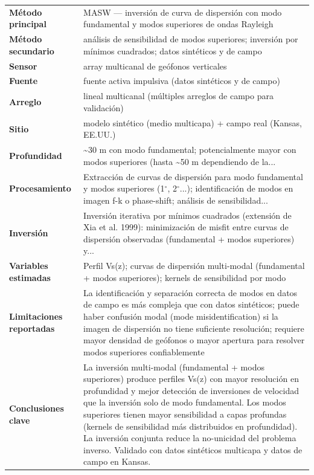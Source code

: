 \begin{center}\scriptsize
\begin{tabularx}{\textwidth}{@{}>{\bfseries}p{3.3cm} X@{}}
\toprule
M\'etodo principal & MASW --- inversión de curva de dispersión con modo fundamental y modos superiores de ondas Rayleigh \\
M\'etodo secundario & análisis de sensibilidad de modos superiores; inversión por mínimos cuadrados; datos sintéticos y de campo \\
Sensor & array multicanal de geófonos verticales \\
Fuente & fuente activa impulsiva (datos sintéticos y de campo) \\
Arreglo & lineal multicanal (múltiples arreglos de campo para validación) \\
Sitio & modelo sintético (medio multicapa) + campo real (Kansas, EE.UU.) \\
Profundidad & \textasciitilde{}30 m con modo fundamental; potencialmente mayor con modos superiores (hasta \textasciitilde{}50 m dependiendo de la... \\
Procesamiento & Extracción de curvas de dispersión para modo fundamental y modos superiores (1$^{\circ}$, 2$^{\circ}$...); identificación de modos en imagen f-k o phase-shift; análisis de sensibilidad... \\
Inversi\'on & Inversión iterativa por mínimos cuadrados (extensión de Xia et al. 1999): minimización de misfit entre curvas de dispersión observadas (fundamental + modos superiores) y... \\
Variables estimadas & Perfil Vs(z); curvas de dispersión multi-modal (fundamental + modos superiores); kernels de sensibilidad por modo \\
Limitaciones reportadas & La identificación y separación correcta de modos en datos de campo es más compleja que con datos sintéticos; puede haber confusión modal (mode misidentification) si la imagen de dispersión no tiene suficiente resolución; requiere mayor densidad de geófonos o mayor apertura para resolver modos superiores confiablemente \\
Conclusiones clave & La inversión multi-modal (fundamental + modos superiores) produce perfiles Vs(z) con mayor resolución en profundidad y mejor detección de inversiones de velocidad que la inversión solo de modo fundamental. Los modos superiores tienen mayor sensibilidad a capas profundas (kernels de sensibilidad más distribuidos en profundidad). La inversión conjunta reduce la no-unicidad del problema inverso. Validado con datos sintéticos multicapa y datos de campo en Kansas. \\

\end{tabularx}
\end{center}
